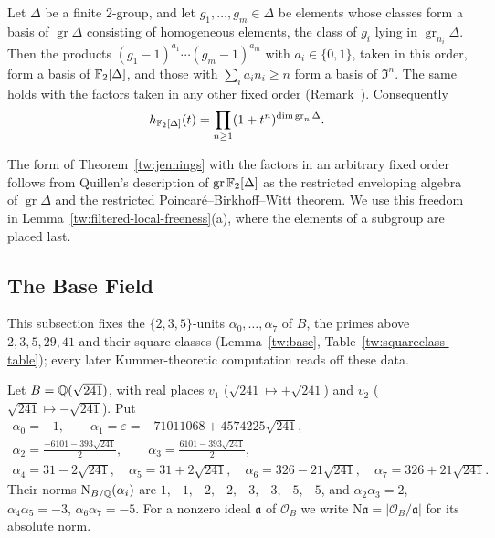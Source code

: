 \begin{theorem}\label{tw:jennings}
Let $\Delta$ be a finite $2$-group, and let $g_1,\dots,g_m\in\Delta$ be
elements whose classes form a basis of $\operatorname{gr}\Delta$ consisting of
homogeneous elements, the class of $g_i$ lying in
$\operatorname{gr}_{n_i}\Delta$. Then the products
$(g_1-1)^{a_1}\cdots(g_m-1)^{a_m}$ with $a_i\in\{0,1\}$, taken in this order,
form a basis of $\mathbb F_2[\Delta]$, and those with $\sum_ia_in_i\ge n$ form a
basis of $\mathfrak I^n$. The same holds with the factors taken in any other
fixed order (Remark~). Consequently
\[
 h_{\mathbb F_2[\Delta]}(t)=\prod_{n\ge1}(1+t^n)^{\dim\operatorname{gr}_n\Delta}.
\]
\end{theorem}

\begin{remark}\label{tw:jennings-order}
The form of Theorem~\ref{tw:jennings} with the factors in an arbitrary fixed
order follows from Quillen's description of $\operatorname{gr}\mathbb F_2[\Delta]$
as the restricted enveloping algebra of $\operatorname{gr}\Delta$
\cite{Quillen} and the restricted Poincar\'e--Birkhoff--Witt theorem. We use
this freedom in Lemma~\ref{tw:filtered-local-freeness}(a), where the elements
of a subgroup are placed last.
\end{remark}

\subsection{The Base Field}\label{tw:base-section}
This subsection fixes the $\{2,3,5\}$-units $\alpha_0,\dots,\alpha_7$ of
$B$, the primes above $2,3,5,29,41$ and their square classes
(Lemma~\ref{tw:base}, Table~\ref{tw:squareclass-table}); every later
Kummer-theoretic computation reads off these data.

Let $B=\mathbb Q(\sqrt{241})$, with real places $v_1$ ($\sqrt{241}\mapsto+\sqrt{241}$)
and $v_2$ ($\sqrt{241}\mapsto-\sqrt{241}$). Put
\begin{equation}\label{tw:alpha}
\begin{gathered}
 \alpha_0=-1,\qquad \alpha_1=\varepsilon=-71011068+4574225\sqrt{241},\\
 \alpha_2=\tfrac{-6101-393\sqrt{241}}2,\qquad
 \alpha_3=\tfrac{6101-393\sqrt{241}}2,\\
 \alpha_4=31-2\sqrt{241},\quad \alpha_5=31+2\sqrt{241},\quad
 \alpha_6=326-21\sqrt{241},\quad \alpha_7=326+21\sqrt{241}.
\end{gathered}
\end{equation}
Their norms $\mathrm N_{B/\mathbb Q}(\alpha_i)$ are $1,-1,-2,-2,-3,-3,-5,-5$, and
$\alpha_2\alpha_3=2$, $\alpha_4\alpha_5=-3$, $\alpha_6\alpha_7=-5$. For a
nonzero ideal $\mathfrak a$ of $\mathcal O_B$ we write
$\mathrm N\mathfrak a=|\mathcal O_B/\mathfrak a|$ for its absolute norm.

